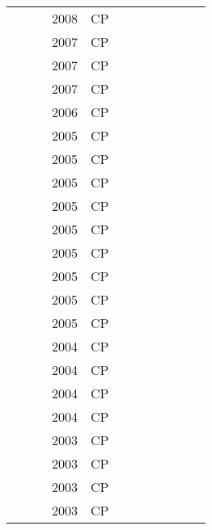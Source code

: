 \documentclass[a4paper]{article}
\begin{document}
{\begin{longtable}{p{3cm}p{6cm}rrcrlcccp{1.5cm}l}
& \href{papers/MouraSCL08.pdf}{} & \cite{MouraSCL08} & 2008 & CP & & & & & & & \\
& \href{papers/DavenportKRSH07.pdf}{} & \cite{DavenportKRSH07} & 2007 & CP & & & & & & & \\
& \href{papers/GarganiR07.pdf}{} & \cite{GarganiR07} & 2007 & CP & & & & & & & \\
& \href{papers/KrogtLPHJ07.pdf}{} & \cite{KrogtLPHJ07} & 2007 & CP & & & & & & & \\
& \href{papers/KhemmoudjPB06.pdf}{} & \cite{KhemmoudjPB06} & 2006 & CP & & & & & & & \\
& \href{papers/ArtiouchineB05.pdf}{} & \cite{ArtiouchineB05} & 2005 & CP & & & & & & & \\
& \href{papers/FortinZDF05.pdf}{} & \cite{FortinZDF05} & 2005 & CP & & & & & & & \\
& \href{papers/cp-Hooker05.pdf}{} & \cite{cp-Hooker05} & 2005 & CP & & & & & & & \\
& \href{papers/DilkinaDH05.pdf}{} & \cite{DilkinaDH05} & 2005 & CP & & & & & & & \\
& \href{papers/AbrilSB05.pdf}{} & \cite{AbrilSB05} & 2005 & CP & & & & & & & \\
& \href{papers/CarchraeBF05.pdf}{} & \cite{CarchraeBF05} & 2005 & CP & & & & & & & \\
& \href{papers/WuBB05.pdf}{} & \cite{WuBB05} & 2005 & CP & & & & & & & \\
& \href{papers/HebrardTW05.pdf}{} & \cite{HebrardTW05} & 2005 & CP & & & & & & & \\
& \href{papers/KovacsEKV05.pdf}{} & \cite{KovacsEKV05} & 2005 & CP & & & & & & & \\
& \href{papers/VilimBC04.pdf}{} & \cite{VilimBC04} & 2004 & CP & & & & & & & \\
& \href{papers/Hooker04.pdf}{} & \cite{Hooker04} & 2004 & CP & & & & & & & \\
& \href{papers/KovacsV04.pdf}{} & \cite{KovacsV04} & 2004 & CP & & & & & & & \\
& \href{papers/LimRX04.pdf}{} & \cite{LimRX04} & 2004 & CP & & & & & & & \\
& \href{papers/OddiPCC03.pdf}{} & \cite{OddiPCC03} & 2003 & CP & & & & & & & \\
& \href{papers/Kumar03.pdf}{} & \cite{Kumar03} & 2003 & CP & & & & & & & \\
& \href{papers/Wolf03.pdf}{} & \cite{Wolf03} & 2003 & CP & & & & & & & \\
& \href{papers/DannaP03.pdf}{} & \cite{DannaP03} & 2003 & CP & & & & & & & \\

\end{longtable}}
\end{document}

